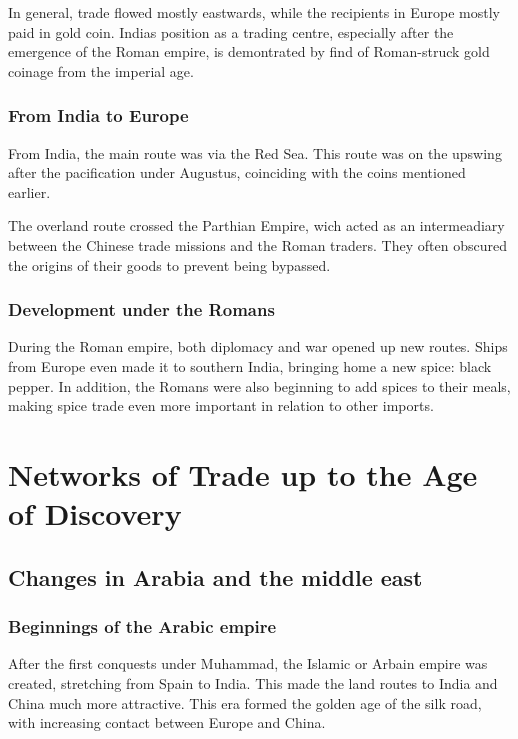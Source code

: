\documentclass[11pt, a4paper, headings=standardclasses]{scrartcl}
\begin{document}
In general, trade flowed mostly eastwards, while the recipients in Europe mostly paid in gold coin. Indias position as a trading centre, especially after the emergence of the Roman empire, is demontrated by find of Roman-struck gold coinage from the imperial age.\autocite[100]{curtin_1984}

\subsubsection{From India to Europe}

From India, the main route was via the Red Sea. This route was on the upswing after the pacification under Augustus, coinciding with the coins mentioned earlier.\autocite[Chapter 7]{Rome}

The overland route crossed the Parthian Empire, wich acted as an intermeadiary between the Chinese trade missions and the Roman traders. They often obscured the origins of their goods to prevent being bypassed.\autocite{SilkRome}

\subsubsection{Development under the Romans}

During the Roman empire, both diplomacy and war opened up new routes. Ships from Europe even made it to southern India, bringing home a new spice: black pepper. In addition, the Romans were also beginning to add spices to their meals, making spice trade even more important in relation to other imports.\autocite{SilkRome, Rome}
\section{Networks of Trade up to the Age of Discovery}

\subsection{Changes in Arabia and the middle east}

\subsubsection{Beginnings of the Arabic empire}
After the first conquests under Muhammad, the Islamic or Arbain empire was created, stretching from Spain to India\autocite[Section \textit{Achievements}]{Umayyad}. This made the land routes to India and China much more attractive. This era formed the golden age of the silk road, with increasing contact between Europe and China.
\end{document}
